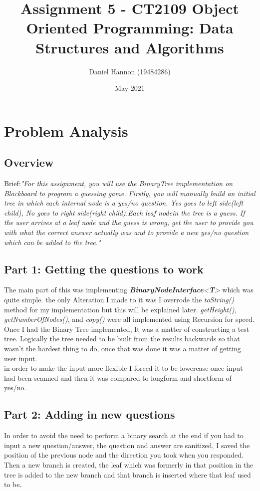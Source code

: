 \documentclass{article}
\title{Assignment 5 - CT2109 Object Oriented Programming: Data Structures and Algorithms}
\author{Daniel Hannon (19484286)}
\date{May 2021}
\begin{document}
	\maketitle
	\section{Problem Analysis}
	\subsection{Overview}
	Brief:\textit{"For this assignment, you will use the BinaryTree implementation on Blackboard to program a guessing game. Firstly, you will manually build an initial tree in which each internal node is a yes/no question. Yes goes to left side(left child), No goes to right side(right child).Each leaf nodein the tree is a guess. If the user arrives at a leaf node and the guess is wrong, get the user to provide you with what the correct answer actually was and to provide a new yes/no question which can be added to the tree."}
	\subsection{Part 1: Getting the questions to work}
	The main part of this was implementing \textit{\textbf{BinaryNodeInterface}<\textbf{T}>} which was quite simple. the only Alteration I made to it was I overrode the \textit{toString()} method for my implementation but this will be explained later. \textit{getHeight()}, \textit{getNumberOfNodes()}, and \textit{copy()} were all implemented using Recursion for speed.\\
	Once I had the Binary Tree implemented, It was a matter of constructing a test tree. Logically the tree needed to be built from the results backwards so that wasn't the hardest thing to do, once that was done it was a matter of getting user input.\\
	in order to make the input more flexible I forced it to be lowercase once input had been scanned and then it was compared to longform and shortform of yes/no.
	\subsection{Part 2: Adding in new questions}
	In order to avoid the need to perform a binary search at the end if you had to input a new question/answer, the question and answer are sanitized, I saved the position of the previous node and the direction you took when you responded. Then a new branch is created, the leaf which was formerly in that position in the tree is added to the new branch and that branch is inserted where that leaf used to be.
	\newpage
\end{document}
